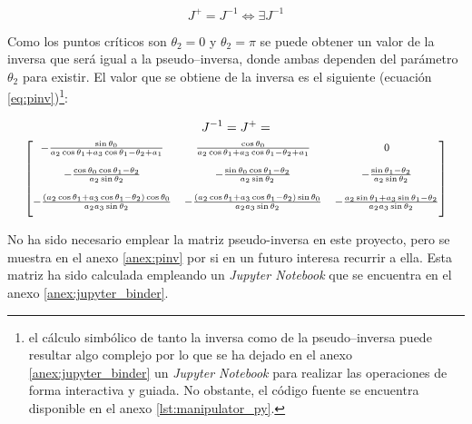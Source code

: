 \begin{equation*}
    J^+ = J^{-1} \iff \exists J^{-1}
\end{equation*}

Como los puntos críticos son $\theta_2 = 0$ y $\theta_2 = \pi$ se puede obtener un valor
de la inversa que será igual a la pseudo--inversa, donde ambas dependen del parámetro
$\theta_2$ para existir. El valor que se obtiene de la inversa es el siguiente (ecuación
\ref{eq:pinv})\footnote{el cálculo simbólico de tanto la inversa como de la pseudo--inversa
    puede resultar algo complejo por lo que se ha dejado en el anexo \ref{anex:jupyter_binder}
    un \textit{Jupyter Notebook} para realizar las operaciones de forma interactiva y guiada.
    No obstante, el código fuente se encuentra disponible en el anexo \ref{lst:manipulator_py}.}:

\begin{gather}\label{eq:pinv}
    J^{-1} = J^+ = \\
    {\footnotesize\begin{bmatrix}
        - \frac{\sin{\theta_{0}}}{a_{2} \cos{\theta_{1}} + a_{3} \cos{\theta_{1} - \theta_{2}} + a_{1}}                                   & \frac{\cos{\theta_{0}}}{a_{2} \cos{\theta_{1}} + a_{3} \cos{\theta_{1} - \theta_{2}} + a_{1}}                                     & 0                                                                                                   \\[3ex]
        - \frac{\cos{\theta_{0}} \cos{\theta_{1} - \theta_{2}}}{a_{2} \sin{\theta_{2}}}                                                   & - \frac{\sin{\theta_{0}} \cos{\theta_{1} - \theta_{2}}}{a_{2} \sin{\theta_{2}}}                                                   & - \frac{\sin{\theta_{1} - \theta_{2}}}{a_{2} \sin{\theta_{2}}}                                      \\[3ex]
        - \frac{\left(a_{2} \cos{\theta_{1}} + a_{3} \cos{\theta_{1} - \theta_{2}}\right) \cos{\theta_{0}}}{a_{2} a_{3} \sin{\theta_{2}}} & - \frac{\left(a_{2} \cos{\theta_{1}} + a_{3} \cos{\theta_{1} - \theta_{2}}\right) \sin{\theta_{0}}}{a_{2} a_{3} \sin{\theta_{2}}} & - \frac{a_{2} \sin{\theta_{1}} + a_{3} \sin{\theta_{1} - \theta_{2}}}{a_{2} a_{3} \sin{\theta_{2}}} \\[2ex]
    \end{bmatrix}} \nonumber
\end{gather}

No ha sido necesario emplear la matriz pseudo-inversa en este proyecto, pero se muestra
en el anexo \ref{anex:pinv} por si en un futuro interesa recurrir a ella.
Esta matriz ha sido calculada empleando un \textit{Jupyter Notebook} que se encuentra
en el anexo \ref{anex:jupyter_binder}.